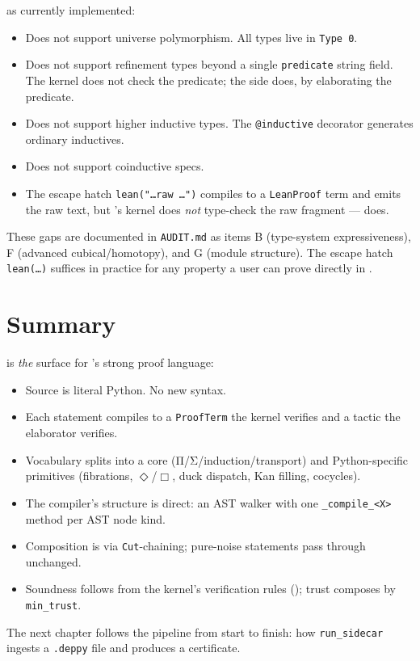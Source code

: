 \PSDL{} as currently implemented:
\begin{itemize}[leftmargin=1.7em]
  \item Does not support universe polymorphism.  All types live in
    \texttt{Type 0}.
  \item Does not support refinement types beyond a single
    \texttt{predicate} string field.  The kernel does not check the
    predicate; the \Lean{} side does, by elaborating the predicate.
  \item Does not support higher inductive types.  The
    \texttt{@inductive} decorator generates ordinary inductives.
  \item Does not support coinductive specs.
  \item The escape hatch \texttt{lean("\dots raw \dots")} compiles to
    a \texttt{LeanProof} term and emits the raw text, but \Deppy{}'s
    kernel does \emph{not} type-check the raw fragment ---
    \Lean{} does.
\end{itemize}

These gaps are documented in \texttt{AUDIT.md} as items B (type-system
expressiveness), F (advanced cubical/homotopy), and G (module
structure).  The escape hatch \texttt{lean(\dots)} suffices in
practice for any property a user can prove directly in \Lean.

\section{Summary}
\label{sec:ch6-summary}

\PSDL{} is \emph{the} surface for \Deppy{}'s strong proof language:
\begin{itemize}[leftmargin=1.7em]
  \item Source is literal Python.  No new syntax.
  \item Each statement compiles to a \texttt{ProofTerm} the kernel
    verifies and a \Lean{} tactic the elaborator verifies.
  \item Vocabulary splits into a \CIC{} core (Π/Σ/induction/transport)
    and Python-specific primitives (fibrations, $\Diamond$/$\Box$,
    duck dispatch, Kan filling, cocycles).
  \item The compiler's structure is direct: an AST walker with one
    \texttt{\_compile\_<X>} method per AST node kind.
  \item Composition is via \texttt{Cut}-chaining; pure-noise
    statements pass through unchanged.
  \item Soundness follows from the kernel's verification rules
    (); trust composes by \texttt{min\_trust}.
\end{itemize}

The next chapter follows the pipeline from start to finish: how
\texttt{run\_sidecar} ingests a \texttt{.deppy} file and produces a
\Lean{} certificate.
